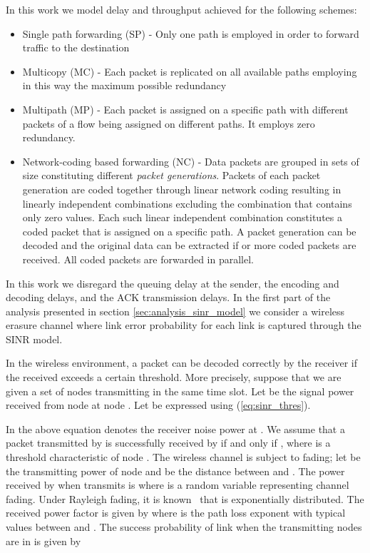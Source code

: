 \documentclass[journal, onecolumn, 12pt]{IEEEtran}
\begin{document}
In this work we model delay and throughput achieved for the following schemes:
\begin{itemize}
\item Single path forwarding (SP) - Only one path is employed in order to forward traffic to the destination
\item Multicopy (MC) - Each packet is replicated on all available
paths employing in this way the maximum possible redundancy
\item Multipath (MP) - Each packet is assigned on a specific path with different packets of a flow being assigned on different paths. It employs zero redundancy.
\item Network-coding based forwarding (NC) - Data packets are grouped in sets of size  constituting different \textit{packet generations}.
Packets of each packet generation are coded together through linear network coding resulting in  linearly independent combinations excluding the combination that contains only zero values.
Each such linear independent combination constitutes a coded packet that is assigned on a specific path.
A packet generation can be decoded and the original data can be extracted if  or more coded packets are received.
All coded packets are forwarded in parallel.
\end{itemize}

In this work we disregard the queuing delay at the sender, the encoding and decoding delays, and the ACK transmission delays.
In the first part of the analysis presented in section \ref{sec:analysis_sinr_model} we consider a wireless erasure channel where link error probability for each link is captured through the SINR model.

In the wireless environment, a packet can be decoded correctly by the receiver if the received  exceeds a certain threshold.
More precisely, suppose that we are given a set  of nodes transmitting in the same time slot.
Let   be the signal power received from node  at node .
Let  be expressed using (\ref{eq:sinr_thres}).

In the above equation  denotes the receiver noise power at . We assume that a packet transmitted by  is successfully received by 
if and only if , where  is a threshold characteristic of node . The wireless channel is subject to fading;
let  be the transmitting power of node  and  be the distance between  and . The power received by  when 
transmits is  where  is a random variable representing channel fading. Under Rayleigh fading, it is
known~\cite{b:Tse} that  is exponentially distributed. The received power factor  is given by 
where  is the path loss exponent with typical values between  and . The success probability of link  when the transmitting nodes
are in  is given by
\end{document}
